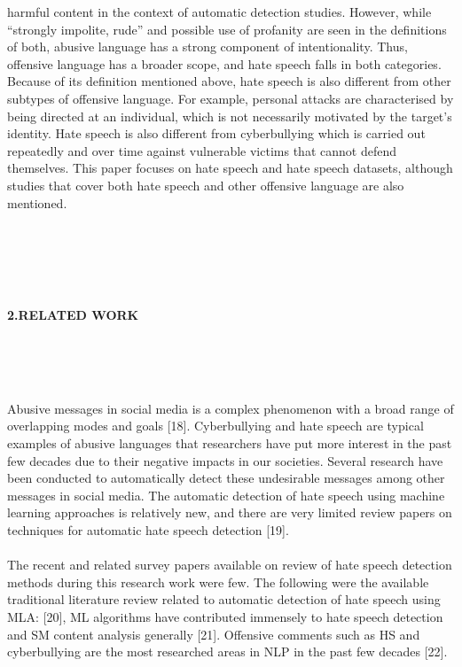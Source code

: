 \documentclass{letter}
\begin{document}
\begin{multicols}{2}
\begin{normalsize}{harmful content in the context of automatic detection 
studies. However, while ``strongly impolite, rude'' and 
possible use of profanity are seen in the definitions of 
both, abusive language has a strong component of 
intentionality. Thus, offensive language has a broader 
scope, and hate speech falls in both categories. Because 
of its definition mentioned above, hate speech is also 
different from other subtypes of offensive language. For 
example, personal attacks are characterised by being 
directed at an individual, which is not necessarily 
motivated by the target's identity. Hate speech is also 
different from cyberbullying which is carried out 
repeatedly and over time against vulnerable victims 
that cannot defend themselves. This paper focuses on 
hate speech and hate speech datasets, although studies 
that cover both hate speech and other offensive 
language are also mentioned.}
\end{normalsize}\\ \\ \\ \\
\begin{normalsize}\textbf{2.RELATED WORK}\end{normalsize}\\  \\ \\
\begin{normalsize}{Abusive messages in social media is a complex 
phenomenon with a broad range of overlapping modes 
and goals [18]. Cyberbullying and hate speech are 
typical examples of abusive languages that researchers 
have put more interest in the past few decades due to 
their negative impacts in our societies. Several research 
have been conducted to automatically detect these 
undesirable messages among other messages in social 
media. The automatic detection of hate speech using 
machine learning approaches is relatively new, and 
there are very limited review papers on techniques for 
automatic hate speech detection [19]. \\ \\
The recent and related survey papers available on 
review of hate speech detection methods during this 
research work were few. The following were the 
available traditional literature review related to 
automatic detection of hate speech using MLA: [20], ML 
algorithms have contributed immensely to hate speech 
detection and SM content analysis generally [21]. 
Offensive comments such as HS and cyberbullying are 
the most researched areas in NLP in the past few 
decades [22].\\ \\

}
\end{normalsize}
\end{multicols}
\end{document}
